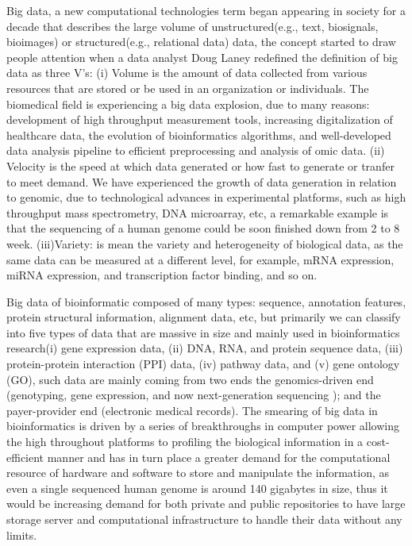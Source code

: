 \documentclass[12pt]{article}
\begin{document}
Big data, a new computational technologies term began appearing in society for a decade that describes the large volume of unstructured(e.g., text, biosignals, bioimages) or structured(e.g., relational data) data, the concept started to draw people attention when a data analyst Doug Laney redefined the definition of big data as three V’s:
(i) Volume is the amount of data collected from various resources that are stored or be used in an organization or individuals. The biomedical field is experiencing a big data explosion, due to many reasons: development of high throughput measurement tools, increasing digitalization of healthcare data, the evolution of bioinformatics algorithms, and well-developed data analysis pipeline to efficient preprocessing and analysis of omic data. (ii) Velocity is the speed at which data generated or how fast to generate or tranfer to meet demand. We have experienced the growth of data generation in relation to genomic, due to technological advances in experimental platforms, such as high throughput mass spectrometry, DNA microarray, etc, a remarkable example is that the sequencing of a human genome could be soon finished down from 2 to 8 week. (iii)Variety: is mean the variety and heterogeneity of biological data, as the same data can be measured at a different level, for example,  mRNA expression, miRNA expression, and transcription factor binding, and so on. \medskip

Big data of bioinformatic composed of many types: sequence, annotation features, protein structural information, alignment data, etc, but primarily we can classify into five types of data that are massive in size and mainly used in bioinformatics research(i) gene expression data, (ii) DNA, RNA, and protein sequence data, (iii) protein-protein interaction (PPI) data, (iv) pathway data, and (v) gene ontology (GO), such data are mainly coming from two ends the genomics-driven end (genotyping, gene expression, and now next-generation sequencing ); and the payer-provider end (electronic medical records). The smearing of big data in bioinformatics is driven by a series of breakthroughs in computer power allowing the high throughout platforms to profiling the biological information in a cost-efficient manner and has in turn place a greater demand for the computational resource of hardware and software to store and manipulate the information, as even a single sequenced human genome is around 140 gigabytes in size, thus it would be increasing demand for both private and public repositories to have large storage server and computational infrastructure to handle their data without any limits. \medskip
\end{document}
